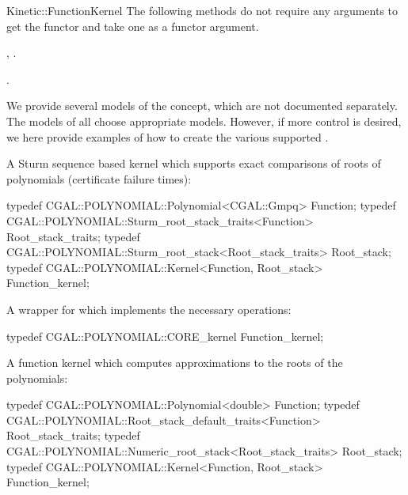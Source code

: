 \begin{ccRefConcept}{Kinetic::FunctionKernel}
The following methods do not require any arguments to get the functor and take one  as a functor argument.










\ccHasModels
{}, .

\ccSeeAlso

.

\ccExample

We provide several models of the concept, which are not documented
separately. The models of  all choose
appropriate models.  However, if
more control is desired, we here provide examples of how to create the
various supported .

A Sturm sequence based kernel which supports exact comparisons of roots of polynomials (certificate failure times):
\begin{ccExampleCode}
typedef CGAL::POLYNOMIAL::Polynomial<CGAL::Gmpq> Function;
typedef CGAL::POLYNOMIAL::Sturm_root_stack_traits<Function> Root_stack_traits;
typedef CGAL::POLYNOMIAL::Sturm_root_stack<Root_stack_traits> Root_stack;
typedef CGAL::POLYNOMIAL::Kernel<Function, Root_stack> Function_kernel;
\end{ccExampleCode}

A wrapper for  which implements the necessary
operations:
\begin{ccExampleCode}
typedef CGAL::POLYNOMIAL::CORE_kernel Function_kernel;
\end{ccExampleCode}

A function kernel which computes approximations to the roots of the polynomials:
\begin{ccExampleCode}
typedef CGAL::POLYNOMIAL::Polynomial<double> Function;
typedef CGAL::POLYNOMIAL::Root_stack_default_traits<Function> Root_stack_traits;
typedef CGAL::POLYNOMIAL::Numeric_root_stack<Root_stack_traits> Root_stack;
typedef CGAL::POLYNOMIAL::Kernel<Function, Root_stack> Function_kernel;
\end{ccExampleCode}


\end{ccRefConcept}
